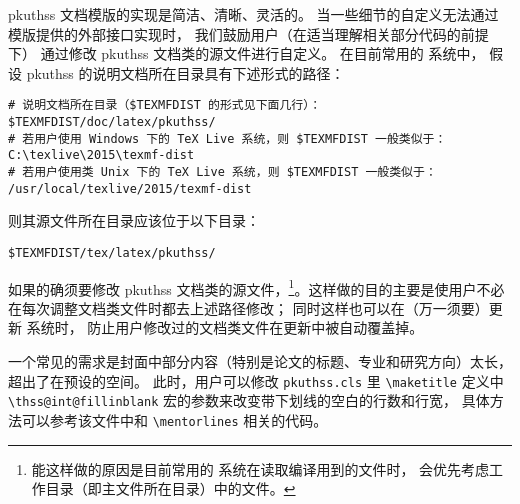 pkuthss 文档模版的实现是简洁、清晰、灵活的。
当一些细节的自定义无法通过模版提供的外部接口实现时，
我们鼓励用户（在适当理解相关部分代码的前提下）
通过修改 pkuthss 文档类的源文件进行自定义。
在目前常用的  系统中，
假设 pkuthss 的说明文档所在目录具有下述形式的路径：
\begin{Verbatim}
# 说明文档所在目录（$TEXMFDIST 的形式见下面几行）：
$TEXMFDIST/doc/latex/pkuthss/
# 若用户使用 Windows 下的 TeX Live 系统，则 $TEXMFDIST 一般类似于：
C:\texlive\2015\texmf-dist
# 若用户使用类 Unix 下的 TeX Live 系统，则 $TEXMFDIST 一般类似于：
/usr/local/texlive/2015/texmf-dist
\end{Verbatim}
则其源文件所在目录应该位于以下目录：
\begin{Verbatim}
$TEXMFDIST/tex/latex/pkuthss/
\end{Verbatim}

如果的确须要修改 pkuthss 文档类的源文件，\footnote{%
  能这样做的原因是目前常用的  系统在读取编译用到的文件时，
  会优先考虑工作目录（即主文件所在目录）中的文件。%
}。这样做的目的主要是使用户不必在每次调整文档类文件时都去上述路径修改；
同时这样也可以在（万一须要）更新  系统时，
防止用户修改过的文档类文件在更新中被自动覆盖掉。

一个常见的需求是封面中部分内容（特别是论文的标题、专业和研究方向）太长，
超出了在预设的空间。
此时，用户可以修改 \verb|pkuthss.cls| 里 \verb|\maketitle| 定义中
\verb|\thss@int@fillinblank| 宏的参数来改变带下划线的空白的行数和行宽，
具体方法可以参考该文件中和 \verb|\mentorlines| 相关的代码。
